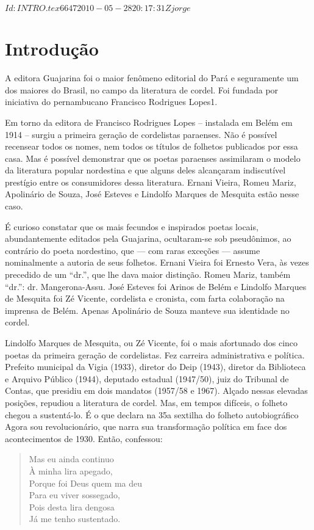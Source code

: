 \SVN $Id: INTRO.tex 6647 2010-05-28 20:17:31Z jorge $

\chapter[Introdução, por Vicente Salles]{Introdução}

A editora Guajarina foi o maior fenômeno editorial do Pará e
seguramente um dos maiores do Brasil, no campo da literatura de
cordel. Foi fundada por iniciativa do pernambucano Francisco
Rodrigues Lopes1.

Em torno da editora de Francisco Rodrigues Lopes – instalada em Belém
em 1914 – surgiu a primeira geração de cordelistas paraenses. Não é
possível recensear todos os nomes, nem todos os títulos de folhetos
publicados por essa casa. Mas é possível demonstrar que os poetas
paraenses assimilaram o modelo da literatura popular nordestina e que
alguns deles alcançaram indiscutível prestígio entre os consumidores
dessa literatura. Ernani Vieira, Romeu Mariz, Apolinário de Souza,
José Esteves e Lindolfo Marques de Mesquita estão nesse caso.

 É curioso constatar que os mais fecundos e inspirados poetas locais,
abundantemente editados pela Guajarina, ocultaram-se sob pseudônimos,
ao contrário do poeta nordestino, que — com raras exceções — assume
nominalmente a autoria de seus folhetos. Ernani Vieira foi Ernesto
Vera, às vezes precedido de um “dr.”, que lhe dava maior distinção.
Romeu Mariz, também “dr.”: dr. Mangerona-Assu. José Esteves foi
Arinos de Belém e Lindolfo Marques de Mesquita foi Zé Vicente,
cordelista e cronista, com farta colaboração na imprensa de Belém.
Apenas Apolinário de Souza manteve sua identidade no cordel.

Lindolfo Marques de Mesquita, ou Zé Vicente, foi o mais afortunado dos
cinco poetas da primeira geração de cordelistas. Fez carreira
administrativa e política. Prefeito municipal da Vigia (1933),
diretor do Deip (1943), diretor da Biblioteca e Arquivo Público
(1944), deputado estadual (1947/50), juiz do Tribunal de Contas, que
presidiu em dois mandatos (1957/58 e 1967). Alçado nessas elevadas
posições, repudiou a literatura de cordel. Mas, em tempos difíceis, o
folheto chegou a sustentá-lo. É o que declara na 35a sextilha do
folheto autobiográfico Agora sou revolucionário, que narra sua
transformação política em face dos acontecimentos de 1930. Então,
confessou:

\begin{verse}
Mas eu ainda continuo\\
À minha lira apegado,\\
Porque foi Deus quem ma deu\\
Para eu viver sossegado,\\
Pois desta lira dengosa\\
Já me tenho sustentado.
\end{verse}

